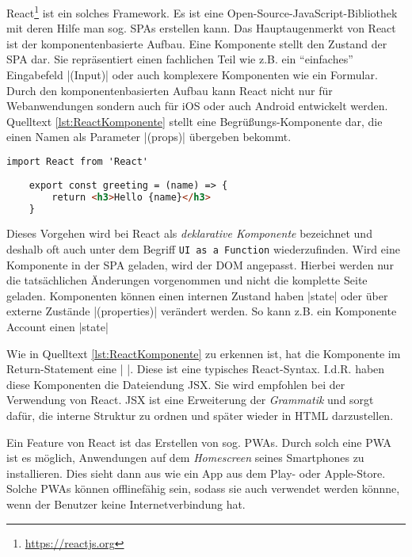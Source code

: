 React\footnote{\url{https://reactjs.org}} ist ein solches Framework. Es ist eine Open-Source-JavaScript-Bibliothek mit deren Hilfe man sog. \acfp{SPA} erstellen kann.\autocite[ ][]{hartmann2019react} 
Das Hauptaugenmerkt von React ist der komponentenbasierte Aufbau. Eine Komponente stellt den Zustand der \acs{SPA} dar. 
Sie repräsentiert einen fachlichen Teil wie z.B. ein \enquote{einfaches} Eingabefeld \jinline|(Input)| oder auch komplexere Komponenten wie ein Formular.
Durch den komponentenbasierten Aufbau kann React nicht nur für Webanwendungen sondern auch für iOS oder auch Android entwickelt werden. 
Quelltext \vref{lst:ReactKomponente} stellt eine Begrüßungs-Komponente dar, die einen Namen als Parameter \jinline|(props)| übergeben bekommt. 

\begin{lstlisting}[caption={React-Komponente: Greeting},label={lst:ReactKomponente},language=HTML, showstringspaces={false}]
	import React from 'React'
	
	export const greeting = (name) => {
		return <h3>Hello {name}</h3>
	}
\end{lstlisting}

Dieses Vorgehen wird bei React als \emph{deklarative Komponente} bezeichnet und deshalb oft auch unter dem Begriff \texttt{UI as a Function} wiederzufinden. \autocite[ ][]{hartmann2019react} 
Wird eine Komponente in der \acs{SPA} geladen, wird der \acs{DOM} angepasst. 
Hierbei werden nur die tatsächlichen Änderungen vorgenommen und nicht die komplette Seite geladen. \newline
Komponenten können einen internen Zustand haben \jinline|state| oder über externe Zustände \jinline|(properties)| verändert werden. So kann z.B. ein Komponente Account einen \jinline|state| 

Wie in Quelltext \vref{lst:ReactKomponente} zu erkennen ist, hat die Komponente im Return-Statement eine \jinline|{ }|. 
Diese ist eine typisches React-Syntax. 
I.d.R. haben diese Komponenten die Dateiendung \acf{JSX}. 
Sie wird empfohlen bei der Verwendung von React. 
\acs{JSX} ist eine Erweiterung der \emph{Grammatik} und sorgt dafür, die interne Struktur zu ordnen und später wieder in \acs{HTML} darzustellen.\autocite[ ][]{WasIstJSX} 

Ein Feature von React ist das Erstellen von sog. \acfp{PWA}. 
Durch solch eine \acs{PWA} ist es möglich, Anwendungen auf dem \emph{Homescreen} seines Smartphones zu installieren. 
Dies sieht dann aus wie ein App aus dem Play- oder Apple-Store. 
Solche \acsp*{PWA} können offlinefähig sein, sodass sie auch verwendet werden könnne, wenn der Benutzer keine Internetverbindung hat. \autocite[ ][]{hartmann2019react} 

